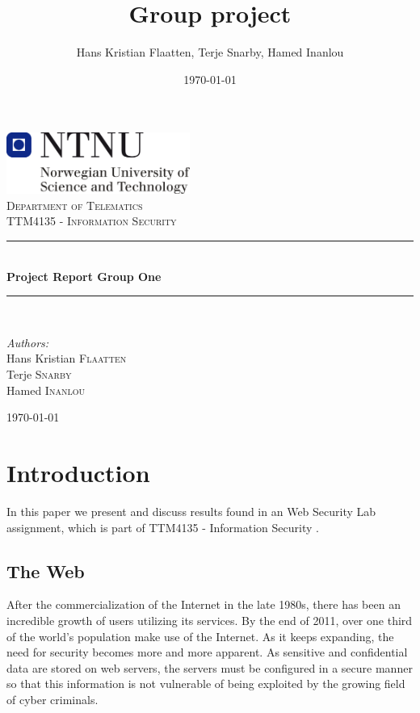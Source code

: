 \documentclass[a4paper, 12pt]{article}
\title{Group project}
\author{Hans Kristian Flaatten, Terje Snarby, Hamed Inanlou }
\date{\today}
\begin{document}
\begin{titlepage}
\begin{center}
\includegraphics[width=0.45\textwidth]{./img/NTNU-logo.png}\\[5cm]
\textsc{\large Department of Telematics}\\[0.2cm]
\textsc{\Large TTM4135 - Information Security}\\[0.5cm]

\rule{\linewidth}{0.2mm} \\[0.4cm]
{ \LARGE \bfseries Project Report Group One}\\[0.2cm]
\rule{\linewidth}{0.2mm} \\[1.5cm]

\begin{minipage}{0.4\textwidth}
\begin{flushleft} \large
\emph{Authors:}\\
Hans Kristian \textsc{Flaatten}\\
Terje \textsc{Snarby}\\
Hamed \textsc{Inanlou}
\end{flushleft}
\end{minipage}

\vfill
{\large \today}
\end{center}
\end{titlepage}


\section{Introduction}
In this paper we present and discuss results found in an Web Security Lab assignment, which is part of TTM4135 - Information Security \cite{Boney96}.

\subsection{The Web}
After the commercialization of the Internet in the late 1980s, there has been an incredible growth of users utilizing its services. By the end of 2011, over one third of the world’s population make use of the Internet. As it keeps expanding, the need for security becomes more and more apparent. As sensitive and confidential data are stored on web servers, the servers must be configured in a secure manner so that this information is not vulnerable of being exploited by the growing field of cyber criminals.
\end{document}
